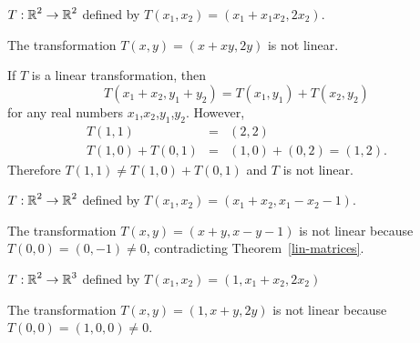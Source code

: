 \documentclass{ximera}
\begin{document}
\begin{exercise} \label{c4.3.6b}
  $T:\mbox{$\Bbb{R}$}^2\to\mbox{$\Bbb{R}$}^2$ defined by $T(x_1,x_2)=(x_1+x_1x_2,2x_2)$.

\begin{solution}
\ans The transformation $T(x,y) = (x + xy, 2y)$ is not linear.

\soln If $T$ is a linear transformation, then
\[
T(x_1 + x_2,y_1 + y_2) = T(x_1,y_1) + T(x_2,y_2)
\]
for any real numbers $x_1$,$x_2$,$y_1$,$y_2$.  However,
\[
\begin{array}{rcl}
T(1,1) & = & (2,2) \\
T(1,0) + T(0,1) & = & (1,0) + (0,2) = (1,2).\end{array}
\]
Therefore $T(1,1) \neq T(1,0) + T(0,1)$ and $T$ is not linear.

\end{solution}
\end{exercise}
\begin{exercise} \label{c4.3.6c}
  $T:\mbox{$\Bbb{R}$}^2\to\mbox{$\Bbb{R}$}^2$ defined by $T(x_1,x_2)=(x_1+x_2,x_1-x_2-1)$.

\begin{solution}
The transformation $T(x,y) = (x + y, x - y - 1)$
is not linear because $T(0,0) = (0,-1) \neq 0$, contradicting
Theorem~\ref{lin-matrices}.

\end{solution}
\end{exercise}
\begin{exercise} \label{c4.3.6d}
  $T:\mbox{$\Bbb{R}$}^2\to\mbox{$\Bbb{R}$}^3$ defined by $T(x_1,x_2)=(1,x_1+x_2,2x_2)$

\begin{solution}
The transformation $T(x,y) = (1,x + y, 2y)$ is not linear
because $T(0,0) = (1,0,0) \neq 0$.

\end{solution}
\end{exercise}
\end{document}
